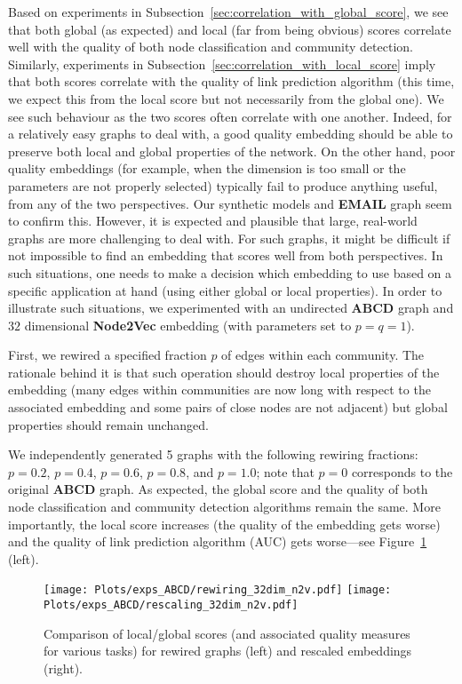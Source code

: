 \documentclass[11pt]{article}
\begin{document}
Based on experiments in Subsection~\ref{sec:correlation_with_global_score}, we see that both global (as expected) and local (far from being obvious) scores correlate well with the quality of both node classification and community detection. Similarly, experiments in Subsection~\ref{sec:correlation_with_local_score} imply that both scores correlate with the quality of link prediction algorithm (this time, we expect this from the local score but not necessarily from the global one). We see such behaviour as the two scores often correlate with one another. Indeed, for a relatively easy graphs to deal with, a good quality embedding should be able to preserve both local and global properties of the network. On the other hand, poor quality embeddings (for example, when the dimension is too small or the parameters are not properly selected) typically fail to produce anything useful, from any of the two perspectives. Our synthetic models and \textbf{EMAIL} graph seem to confirm this. However, it is expected and plausible that large, real-world graphs are more challenging to deal with. For such graphs, it might be difficult if not impossible to find an embedding that scores well from both perspectives. In such situations, one needs to make a decision which embedding to use based on a specific application at hand (using either global or local properties). In order to illustrate such situations, we experimented with an undirected \textbf{ABCD} graph and $32$ dimensional \textbf{Node2Vec} embedding (with parameters set to $p=q=1$). 

\medskip

First, we rewired a specified fraction $p$ of edges within each community. The rationale behind it is that such operation should destroy local properties of the embedding (many edges within communities are now long with respect to the associated embedding and some pairs of close nodes are not adjacent) but global properties should remain unchanged. 

We independently generated 5 graphs with the following rewiring fractions: $p=0.2$, $p=0.4$, $p=0.6$, $p=0.8$, and $p=1.0$; note that $p=0$ corresponds to the original \textbf{ABCD} graph. As expected, the global score and the quality of both node classification and community detection algorithms remain the same. More importantly, the local score increases (the quality of the embedding gets worse) and the quality of link prediction algorithm (AUC) gets worse---see Figure~\ref{fig:rewiring} (left). 

\begin{figure}[h!]
    \centering
    \texttt{[image: Plots/exps\_ABCD/rewiring\_32dim\_n2v.pdf]}
        \hspace{.1cm}
    \texttt{[image: Plots/exps\_ABCD/rescaling\_32dim\_n2v.pdf]}
    \vspace{.1cm}
    \caption{Comparison of local/global scores (and associated quality measures for various tasks) for rewired graphs (left) and rescaled embeddings (right).}
    \label{fig:rewiring}
\end{figure}
\end{document}

